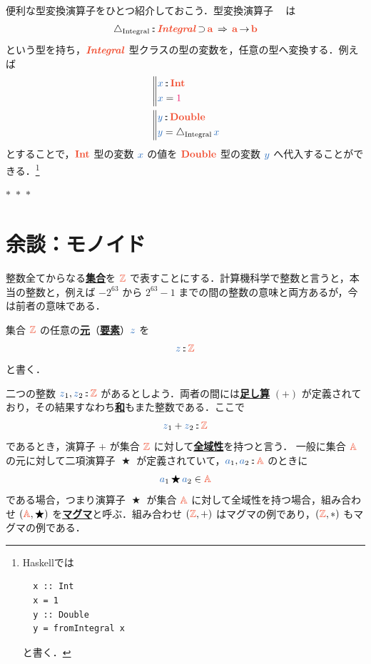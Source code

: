\documentclass[a5paper,twoside,fleqn,draft]{jsbook}
\newcommand{\TK}[1]{\mask{\textbf{TK:}~#1}{C}}
\def\constantColor{WildStrawberry}
\def\varColor{NavyBlue}
\def\typeColor{RedOrange}
\newcommand{\separator}{\begin{center}$*$~$*$~$*$\end{center}}
\newcommand{\programminglanguage}[1]{\textsf{#1}}
\newcommand{\haskell}{\programminglanguage{Haskell}}
\newcommand{\keyword}[1]{{\underline{\textbf{#1}}}}
\newcommand{\mBrace}{\Vert}
\DeclareMathOperator{\mSuperClass}{\;\Rightarrow\;}
\DeclareMathOperator{\mSuperSet}{\supset}
\newcommand{\mConstant}[1]{\textcolor{\constantColor}{#1}}
\newcommand{\mOneNumber}{{\mConstant{1}}}
\newcommand{\mVar}[1]{\textcolor{\varColor}{#1}}
\newcommand{\mAVar}{{\mVar{a}}}
\newcommand{\mXVar}{\mVar{x}}
\newcommand{\mYVar}{\mVar{y}}
\newcommand{\mZVar}{\mVar{z}}
\newcommand{\mUpCast}{\bigtriangleup}
\DeclareMathOperator{\mFromIntegral}{\mUpCast_\text{Integral}}
\DeclareMathOperator{\mBinOp}{\bigstar}
\DeclareMathOperator{\mFuncArrow}{\rightarrow}
\DeclareMathOperator{\mIn}{{:\!:}}
\newcommand{\mSpecialSet}[1]{\textcolor{\typeColor}{\mathbb{#1}}}
\newcommand{\mASet}{\mSpecialSet{A}}
\newcommand{\mZSet}{\mSpecialSet{Z}}
\newcommand{\mType}[1]{\textcolor{\typeColor}{\mathbf{#1}}}
\newcommand{\mA}{\mType{a}}
\newcommand{\mB}{\mType{b}}
\newcommand{\mDoubleType}{\mType{Double}}
\newcommand{\mIntType}{\mType{Int}}
\newcommand{\mTupleWith}[1]{\left(#1\right)}
\newcommand{\mTypeClass}[1]{\textcolor{\typeColor}{\textbf{\textit{#1}}}}
\newcommand{\mIntegralTypeClass}{\mTypeClass{Integral}}
\begin{document}
便利な型変換演算子をひとつ紹介しておこう．型変換演算子
$\mFromIntegral$ は
\begin{equation}
  \mFromIntegral
  \mIn{}\mIntegralTypeClass\mSuperSet\mA
  \mSuperClass\mA\mFuncArrow\mB
\end{equation}
という型を持ち，$\mIntegralTypeClass$ 型クラスの型の変数を，任意の型へ変換する．例えば
\begin{align}
  {}
  &\left\mBrace
  \begin{aligned}
    \mXVar
    &\mIn\mIntType\\
    \mXVar
    &=\mOneNumber
  \end{aligned}
  \right.\\
    {}
    &\left\mBrace
    \begin{aligned}
      \mYVar
      &\mIn\mDoubleType\\
      \mYVar
      &=\mFromIntegral\mXVar
    \end{aligned}
  \right.
\end{align}
とすることで，$\mIntType$ 型の変数 $\mXVar$ の値を $\mDoubleType$ 型の変数 $\mYVar$ へ代入することができる．\footnote{\haskell では
\begin{verbatim}
  x :: Int
  x = 1
  y :: Double
  y = fromIntegral x
\end{verbatim}
と書く．}

\separator

\TK{種}

\section{余談：モノイド}

整数全てからなる\keyword{集合}を $\mZSet$ で表すことにする．計算機科学で整数と言うと，本当の整数と，例えば $-2^{63}$ から $2^{63}-1$ までの間の整数の意味と両方あるが，今は前者の意味である．

集合 $\mZSet$ の任意の\keyword{元}（\keyword{要素}）$\mZVar$ を
\begin{equation}
  \mZVar
  \mIn\mZSet
\end{equation}
と書く．

二つの整数 $\mZVar_1,\mZVar_2\mIn\mZSet$ があるとしよう．両者の間には\keyword{足し算} $(+)$ が定義されており，その結果すなわち\keyword{和}もまた整数である．ここで
\begin{equation}
  \mZVar_1+\mZVar_2
  \mIn\mZSet
\end{equation}
であるとき，演算子 $+$ が集合 $\mZSet$ に対して\keyword{全域性}を持つと言う．
一般に集合 $\mASet$ の元に対して二項演算子 $\mBinOp$ が定義されていて，$\mAVar_1,\mAVar_2\mIn\mASet$ のときに
\begin{equation}
  \label{eq:totality}
  \mAVar_1\mBinOp \mAVar_2
  \in\mASet
\end{equation}
である場合，つまり演算子 $\mBinOp$ が集合 $\mASet$ に対して全域性を持つ場合，組み合わせ $\mTupleWith{\mASet,\mBinOp}$ を\keyword{マグマ}と呼ぶ．組み合わせ $\mTupleWith{\mZSet,+}$ はマグマの例であり，$\mTupleWith{\mZSet,*}$ もマグマの例である．
\end{document}
